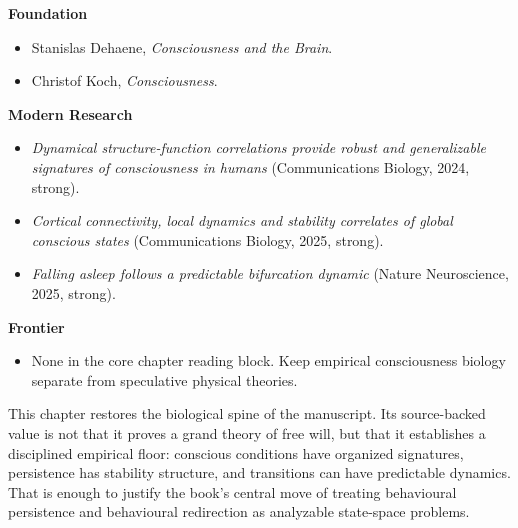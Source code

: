 \begin{readingbox}
\textbf{Foundation}
\begin{itemize}[nosep]
  \item Stanislas Dehaene, \emph{Consciousness and the Brain}.
  \item Christof Koch, \emph{Consciousness}.
\end{itemize}
\textbf{Modern Research}
\begin{itemize}[nosep]
  \item \emph{Dynamical structure-function correlations provide robust and
        generalizable signatures of consciousness in humans}
        (Communications Biology, 2024, strong).
  \item \emph{Cortical connectivity, local dynamics and stability correlates of
        global conscious states} (Communications Biology, 2025, strong).
  \item \emph{Falling asleep follows a predictable bifurcation dynamic}
        (Nature Neuroscience, 2025, strong).
\end{itemize}
\textbf{Frontier}
\begin{itemize}[nosep]
  \item None in the core chapter reading block. Keep empirical consciousness
        biology separate from speculative physical theories.
\end{itemize}
\end{readingbox}

\begin{summarybox}
This chapter restores the biological spine of the manuscript. Its source-backed
value is not that it proves a grand theory of free will, but that it
establishes a disciplined empirical floor: conscious conditions have organized
signatures, persistence has stability structure, and transitions can have
predictable dynamics. That is enough to justify the book's central move of
treating behavioural persistence and behavioural redirection as analyzable
state-space problems.
\end{summarybox}

